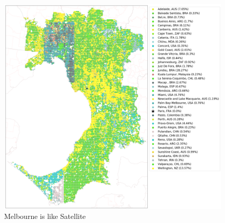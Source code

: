 \documentclass[sageh,times]{sagej}
\begin{document}
\begin{figure}[!htbp]
\includegraphics[scale=0.25]{Images/MelbourneOverallAbrev_sat.png} 
\caption{Melbourne is like Satellite}    
 \label{fig:melmaps}  
\end{figure} 

\end{document}

